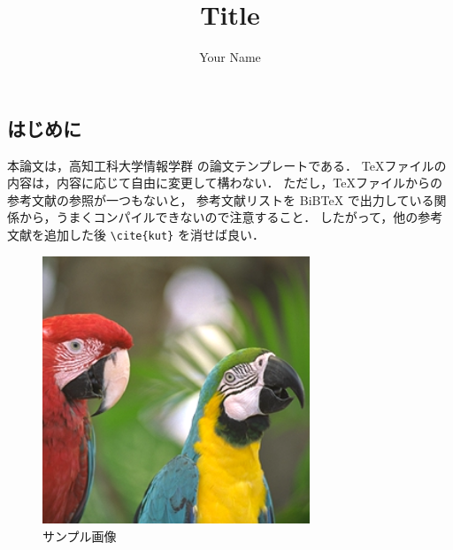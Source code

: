 \documentclass[a4j]{jarticle}
\title{Title}
\author{Your Name}
\begin{document}
\begin{Abstract}

  \section{はじめに}

  本論文は，高知工科大学情報学群 \cite{kut} の論文テンプレートである．
  \TeX ファイルの内容は，内容に応じて自由に変更して構わない．
  ただし，\TeX ファイルからの参考文献の参照が一つもないと，
  参考文献リストを BiBTeX で出力している関係から，うまくコンパイルできないので注意すること．
  したがって，他の参考文献を追加した後 \verb|\cite{kut}| を消せば良い．

  \begin{figure}[ht]
    \centering
    \includegraphics[width=8cm]{images/Parrots.bmp}
    \caption{サンプル画像}
    \label{fig:sample}
  \end{figure}

  
  


\end{Abstract}
\end{document}
